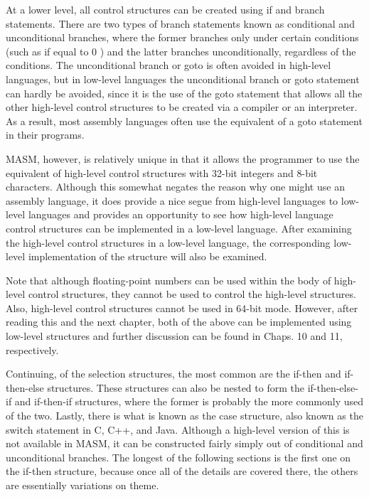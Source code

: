 \documentclass[10pt]{book}
\begin{document}
At a lower level, all control structures can be created using if and branch statements. There are two types of branch statements known as conditional and unconditional branches, where the former branches only under certain conditions (such as if equal to 0 ) and the latter branches unconditionally, regardless of the conditions. The unconditional branch or goto is often avoided in high-level languages, but in low-level languages the unconditional branch or goto statement can hardly be avoided, since it is the use of the goto statement that allows all the other high-level control structures to be created via a compiler or an interpreter. As a result, most assembly languages often use the equivalent of a goto statement in their programs.

MASM, however, is relatively unique in that it allows the programmer to use the equivalent of high-level control structures with 32-bit integers and 8-bit characters. Although this somewhat negates the reason why one might use an assembly language, it does provide a nice segue from high-level languages to low-level languages and provides an opportunity to see how high-level language control structures can be implemented in a low-level language. After examining the high-level control structures in a low-level language, the corresponding low-level implementation of the structure will also be examined.

Note that although floating-point numbers can be used within the body of high-level control structures, they cannot be used to control the high-level structures. Also, high-level control structures cannot be used in 64-bit mode. However, after reading this and the next chapter, both of the above can be implemented using low-level structures and further discussion can be found in Chaps. 10 and 11, respectively.

Continuing, of the selection structures, the most common are the if-then and if-then-else structures. These structures can also be nested to form the if-then-else-if and if-then-if structures, where the former is probably the more commonly used of the two. Lastly, there is what is known as the case structure, also known as the switch statement in C, C++, and Java. Although a high-level version of this is not available in MASM, it can be constructed fairly simply out of conditional and unconditional branches. The longest of the following sections is the first one on the if-then structure, because once all of the details are covered there, the others are essentially variations on theme.
\end{document}
